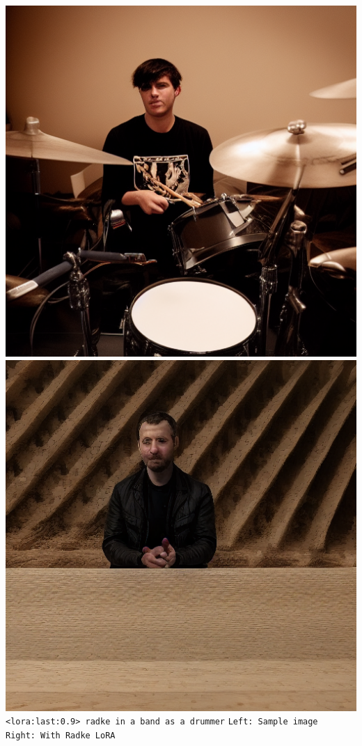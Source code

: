 \documentclass{article}
\begin{document}
\begin{center}
    \includegraphics[scale=0.3]{.imgs/drummer_base.png}
    \includegraphics[scale=0.3]{.imgs/radke_lora_v1.5_(2)_prompting_drummer_2.png} \\
    \verb|<lora:last:0.9> radke in a band as a drummer|
    \verb|Left: Sample image              Right: With Radke LoRA|
\end{center}
\end{document}
